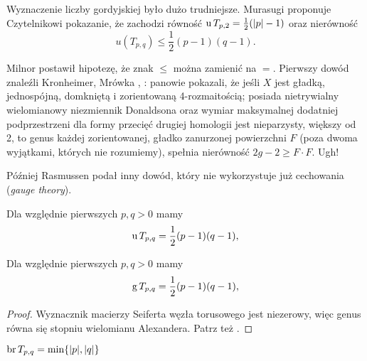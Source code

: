 Wyznaczenie liczby gordyjskiej było dużo trudniejsze.
Murasugi \cite[s. 150]{murasugi96} proponuje Czytelnikowi pokazanie, że zachodzi równość $\operatorname{u} T_{p, 2} = \frac 12 (|p| - 1)$ oraz nierówność
\begin{equation}
    u(T_{p, q}) \le \frac 12 (p-1)(q-1).
\end{equation}

Milnor \cite[uwaga 10.9]{milnor1968} postawił hipotezę, że znak $\le$ można zamienić na $=$.
%
Pierwszy dowód znaleźli Kronheimer, Mrówka \cite{kronheimer93}, \cite{kronheimer95}: panowie pokazali, że jeśli $X$ jest gładką, jednospójną, domkniętą i zorientowaną 4-rozmaitością; posiada nietrywialny wielomianowy niezmiennik Donaldsona oraz wymiar maksymalnej dodatniej podprzestrzeni dla formy przecięć drugiej homologii jest nieparzysty, większy od 2, to genus każdej zorientowanej, gładko zanurzonej powierzchni $F$ (poza dwoma wyjątkami, których nie rozumiemy), spełnia nierówność $2g - 2 \ge F \cdot F$.
Ugh!

Później Rasmussen \cite{rasmussen10} podał inny dowód, który nie wykorzystuje już cechowania (\emph{gauge theory}).
%

\begin{proposition}
%
\label{prp:torus_unknotting_number}%
    Dla względnie pierwszych $p, q > 0$ mamy
    \begin{equation}
        \operatorname{u} T_{p, q} = \frac 12 (p - 1)(q - 1),
    \end{equation}
\end{proposition}

\begin{proposition}
    Dla względnie pierwszych $p, q > 0$ mamy
    \begin{equation}
        \operatorname{g} T_{p, q} = \frac 12 (p - 1)(q - 1),
    \end{equation}
\end{proposition}

\begin{proof}
    Wyznacznik macierzy Seiferta węzła torusowego jest niezerowy, więc genus równa się stopniu wielomianu Alexandera.
    Patrz też \cite[s. 149]{murasugi96}.
\end{proof}

\begin{proposition}
%
    $\operatorname{br} T_{p, q} = \min \{|p|, |q|\}$
\end{proposition}

